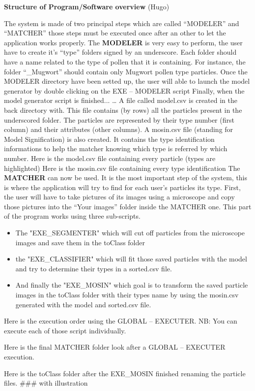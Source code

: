\textbf{Structure of Program/Software overview} (Hugo) 

The system is made of two principal steps which are called “MODELER” and “MATCHER” those steps must be executed once after an other to let the application works properly.
The \textbf{MODELER} is very easy to perform, the user have to create it's “type” folders signed by an underscore.
Each folder should have a name related to the type of pollen that it is containing. For instance, the folder “_Mugwort” should contain only Mugwort pollen type particles.
Once the MODELER directory have been setted up, the user will able to launch the model generator by double clicking on the EXE – MODELER script
Finally, when the model generator script is finished...
… A file called model.csv is created in the back directory with. This file contains (by rows) all the particles present in the underscored folder. The particles are represented by their type number (first column) and their attributes (other columns).
A mosin.csv file (standing for Model Signification) is also created. It contains the type identification informations to help the matcher knowing which type is referred by which number.
Here is the model.csv file containing every particle (types are highlighted)
Here is the mosin.csv file containing every type identification
The \textbf{MATCHER} can now be used. It is the most important step of the system, this is where the application will try to find for each user's particles its type.
First, the user will have to take pictures of its images using a microscope and copy those pictures into the “Your images” folder inside the MATCHER one.
This part of the program works using three sub-scripts.

\begin{itemize}
\item The "EXE_SEGMENTER" which will cut off particles from the microscope images and save them in the toClass folder

\item the "EXE_CLASSIFIER" which will fit those saved particles with the model and try to determine their types in a sorted.csv file.

\item And finally the "EXE_MOSIN" which goal is to transform the saved particle images in the toClass folder with their types name by using the mosin.csv generated with the model and sorted.csv file.
\end{itemize}

Here is the execution order using the GLOBAL – EXECUTER.
NB: You can execute each of those script individually.

Here is the final MATCHER folder look after a GLOBAL – EXECUTER execution.

Here is the toClass folder after the EXE_MOSIN finished renaming the particle files.
### with illustration
    
    
    
    